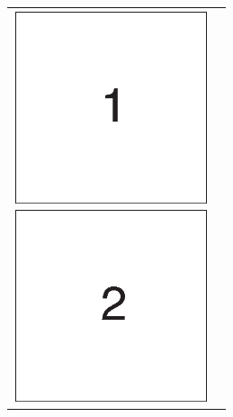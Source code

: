\documentclass[11pt, oneside]{article}
\begin{document}
\begin{figure}[htbp]
\begin{tabular}{cc}
\vspace{\vmargin}

\begin{minipage}{0.333\hsize}
\begin{center}
\includegraphics[width=57mm]{../data/fig1.eps}
\end{center}
\end{minipage}

\begin{minipage}{0.333\hsize}
\begin{center}
\includegraphics[width=57mm]{../data/fig2.eps}
\end{center}
\end{minipage}


\end{tabular}
\end{figure}
\end{document}
